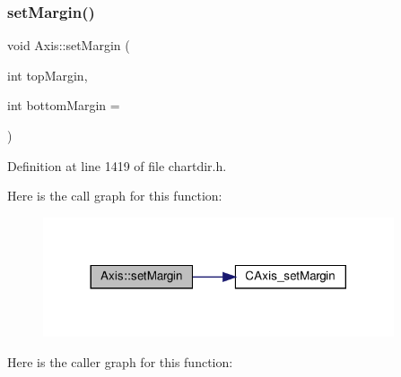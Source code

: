 \subsubsection{\texorpdfstring{set\+Margin()}{setMargin()}}
{\footnotesize\ttfamily void Axis\+::set\+Margin (\begin{DoxyParamCaption}\item[{int}]{top\+Margin,  }\item[{int}]{bottom\+Margin = {} }\end{DoxyParamCaption})\hspace{0.3cm}{\ttfamily [inline]}}



Definition at line 1419 of file chartdir.\+h.

Here is the call graph for this function\+:
\nopagebreak
\begin{figure}[H]
\begin{center}
\leavevmode
\includegraphics[width=293pt]{class_axis_a03b7110aeda343e1c17567741dc47a1d_cgraph}
\end{center}
\end{figure}
Here is the caller graph for this function\+:
\nopagebreak
